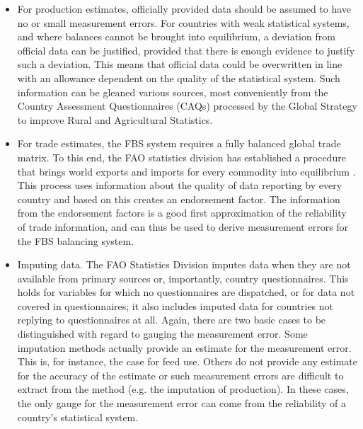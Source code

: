 \documentclass[nojss]{jss}
\begin{document}
\begin{itemize}
\item For production estimates, officially provided data should be assumed to have no or small measurement errors. For countries with weak statistical systems, and where balances cannot be brought into equilibrium, a deviation from official data can be justified, provided that there is enough evidence to justify such a deviation. This means that official data could be overwritten in line with an allowance dependent on the quality of the statistical system. Such information can be gleaned various sources, most conveniently from the Country Assessment Questionnaires (CAQs) processed by the Global Strategy to improve Rural and Agricultural Statistics. 
\item For trade estimates, the FBS system requires a fully balanced global trade matrix. To this end, the FAO statistics division has established a procedure that brings world exports and imports for every commodity into equilibrium . This process uses information about the quality of data reporting by every country and based on this creates an endorsement factor. The information from the endorsement factors is a good first approximation of the reliability of trade information, and can thus be used to derive measurement errors for the FBS balancing system.
\item Imputing data. The FAO Statistics Division imputes data when they are not available from primary sources or, importantly, country questionnaires. This holds for variables for which no questionnaires are dispatched, or for data not covered in questionnaires; it also includes imputed data for countries not replying to questionnaires at all. Again, there are two basic cases to be distinguished with regard to gauging the measurement error. Some imputation methods actually provide an estimate for the measurement error. This is, for instance, the case for feed use. Others do not provide any estimate for the accuracy of the estimate or such measurement errors are difficult to extract from the method (e.g. the imputation of production). In these cases, the only gauge for the measurement error can come from the reliability of a country's statistical system. 
\end{itemize}
\end{document}
